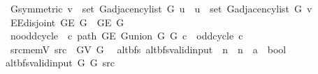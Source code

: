 \begin{isabellebody}
\ \ \ G{}{\isacharunderscore}{\kern0pt}symmetric{\isacharcolon}{\kern0pt}\ {\isachardoublequoteopen}v\ {\isasymin}\ set\ {\isacharparenleft}{\kern0pt}G{\isachardot}{\kern0pt}adjacency{\isacharunderscore}{\kern0pt}list\ G{}\ u{\isacharparenright}{\kern0pt}\ {\isasymlongleftrightarrow}\ u\ {\isasymin}\ set\ {\isacharparenleft}{\kern0pt}G{\isachardot}{\kern0pt}adjacency{\isacharunderscore}{\kern0pt}list\ G{}\ v{\isacharparenright}{\kern0pt}{\isachardoublequoteclose}\isanewline
\ \ \ E{}{\isacharunderscore}{\kern0pt}E{}{\isacharunderscore}{\kern0pt}disjoint{\isacharcolon}{\kern0pt}\ {\isachardoublequoteopen}G{\isachardot}{\kern0pt}E\ G{}\ {\isasyminter}\ G{\isachardot}{\kern0pt}E\ G{}\ {\isacharequal}{\kern0pt}\ {\isacharbraceleft}{\kern0pt}{\isacharbraceright}{\kern0pt}{\isachardoublequoteclose}\isanewline
\ \ \ no{\isacharunderscore}{\kern0pt}odd{\isacharunderscore}{\kern0pt}cycle{\isacharcolon}{\kern0pt}\ {\isachardoublequoteopen}{\isasymnot}\ {\isacharparenleft}{\kern0pt}{\isasymexists}c{\isachardot}{\kern0pt}\ path\ {\isacharparenleft}{\kern0pt}G{\isachardot}{\kern0pt}E\ {\isacharparenleft}{\kern0pt}G{\isachardot}{\kern0pt}union\ G{}\ G{}{\isacharparenright}{\kern0pt}{\isacharparenright}{\kern0pt}\ c\ {\isasymand}\ odd{\isacharunderscore}{\kern0pt}cycle\ c{\isacharparenright}{\kern0pt}{\isachardoublequoteclose}\isanewline
\ \ \ src{\isacharunderscore}{\kern0pt}mem{\isacharunderscore}{\kern0pt}V{}{\isacharcolon}{\kern0pt}\ {\isachardoublequoteopen}src\ {\isasymin}\ G{\isachardot}{\kern0pt}V\ G{}{\isachardoublequoteclose}\isanewline
%
\isadeliminvisible
\isanewline
%
\endisadeliminvisible
%
\isataginvisible
{}\isamarkupfalse%
\ {\isacharparenleft}{\kern0pt}\ alt{\isacharunderscore}{\kern0pt}bfs{\isacharparenright}{\kern0pt}\ alt{\isacharunderscore}{\kern0pt}bfs{\isacharunderscore}{\kern0pt}valid{\isacharunderscore}{\kern0pt}input{\isacharprime}{\kern0pt}\ {\isacharcolon}{\kern0pt}{\isacharcolon}{\kern0pt}\ {\isachardoublequoteopen}{\isacharprime}{\kern0pt}n\ {\isasymRightarrow}\ {\isacharprime}{\kern0pt}n\ {\isasymRightarrow}\ {\isacharprime}{\kern0pt}a\ {\isasymRightarrow}\ bool{\isachardoublequoteclose}\ \isanewline
\ \ {\isachardoublequoteopen}alt{\isacharunderscore}{\kern0pt}bfs{\isacharunderscore}{\kern0pt}valid{\isacharunderscore}{\kern0pt}input{\isacharprime}{\kern0pt}\ G{}\ G{}\ src\ {\isasymequiv}\isanewline

\end{isabellebody}
